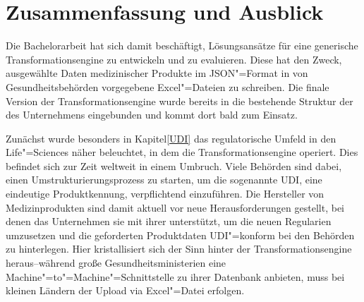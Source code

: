 
\chapter{Zusammenfassung und Ausblick} \label{ZF}

Die Bachelorarbeit hat sich damit beschäftigt, Lösungsansätze für eine generische Transformationsengine zu entwickeln und zu evaluieren. Diese hat den Zweck, ausgewählte Daten medizinischer Produkte im JSON"=Format in von Gesundheitsbehörden vorgegebene Excel"=Dateien zu schreiben. Die finale Version der Transformationsengine wurde bereits in die bestehende Struktur der  des Unternehmens  eingebunden und kommt dort bald zum Einsatz.

Zunächst wurde besonders in Kapitel\nbs\ref{UDI} das regulatorische Umfeld in den Life"=Sciences näher beleuchtet, in dem die Transformationsengine operiert. Dies befindet sich zur Zeit weltweit in einem Umbruch. Viele Behörden sind dabei, einen Umstrukturierungsprozess zu starten, um die sogenannte UDI, eine eindeutige Produktkennung, verpflichtend einzuführen. Die Hersteller von Medizinprodukten sind damit aktuell vor neue Herausforderungen gestellt, bei denen das Unternehmen  sie mit ihrer  unterstützt, um die neuen Regularien umzusetzen und die geforderten Produktdaten UDI"=konform bei den Behörden zu hinterlegen. Hier kristallisiert sich der Sinn hinter der Transformationsengine heraus\nbs --\nbs während große Gesundheitsministerien eine Machine"=to"=Machine"=Schnittstelle zu ihrer Datenbank anbieten, muss bei kleinen Ländern der Upload via Excel"=Datei erfolgen. 

